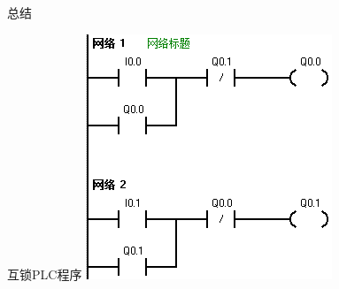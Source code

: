 \begin{frame}{总结}
\begin{block}{互锁PLC程序}
\includegraphics[scale=0.95]{fusuoPLC.png}
\end{block}
\end{frame}
\endinput